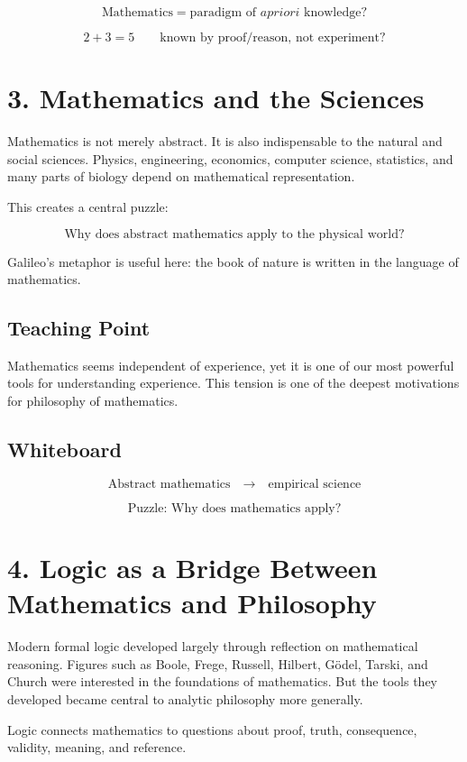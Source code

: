 \documentclass[11pt]{article}
\begin{document}
\[
\text{Mathematics} = \text{paradigm of } a priori \text{ knowledge?}
\]

\[
2+3=5
\qquad
\text{known by proof/reason, not experiment?}
\]

\section*{3. Mathematics and the Sciences}

Mathematics is not merely abstract. It is also indispensable to the natural and social
sciences. Physics, engineering, economics, computer science, statistics, and many parts of
biology depend on mathematical representation.

This creates a central puzzle:

\[
\boxed{\text{Why does abstract mathematics apply to the physical world?}}
\]

Galileo's metaphor is useful here: the book of nature is written in the language of
mathematics.

\subsection*{Teaching Point}

Mathematics seems independent of experience, yet it is one of our most powerful tools for
understanding experience. This tension is one of the deepest motivations for philosophy of
mathematics.

\subsection*{Whiteboard}

\[
\text{Abstract mathematics}
\quad \longrightarrow \quad
\text{empirical science}
\]

\[
\text{Puzzle: Why does mathematics apply?}
\]

\section*{4. Logic as a Bridge Between Mathematics and Philosophy}

Modern formal logic developed largely through reflection on mathematical reasoning.
Figures such as Boole, Frege, Russell, Hilbert, G\"odel, Tarski, and Church were interested
in the foundations of mathematics. But the tools they developed became central to
analytic philosophy more generally.

Logic connects mathematics to questions about proof, truth, consequence, validity,
meaning, and reference.
\end{document}
